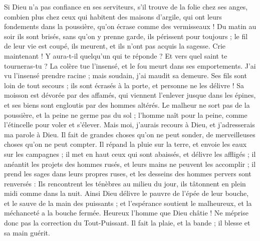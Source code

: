\begin{multicols}{2}
Si Dieu n'a pas confiance en ses serviteurs, s'il trouve de la folie chez ses anges,
combien plus chez ceux qui habitent des maisons d'argile, qui ont leurs fondements dans la poussière, qu'on écrase comme des vermisseaux !
Du matin au soir ils sont brisés, sans qu'on y prenne garde, ils périssent pour toujours ;
le fil de leur vie est coupé, ils meurent, et ils n'ont pas acquis la sagesse.
\VerseOne{}Crie maintenant ! Y aura-t-il quelqu'un qui te réponde ? Et vers quel saint te tourneras-tu ?
La colère tue l'insensé, et le fou meurt dans ses emportements.
J'ai vu l'insensé prendre racine ; mais soudain, j'ai maudit sa demeure.
Ses fils sont loin de tout secours ; ils sont écrasés à la porte, et personne ne les délivre !
Sa moisson est dévorée par des affamés, qui viennent l'enlever jusque dans les épines, et ses biens sont engloutis par des hommes altérés.
Le malheur ne sort pas de la poussière, et la peine ne germe pas du sol ;
l'homme naît pour la peine, comme l'étincelle pour voler et s'élever.
Mais moi, j'aurais recours à Dieu, et j'adresserais ma parole à Dieu.
Il fait de grandes choses qu'on ne peut sonder, de merveilleuses choses qu'on ne peut compter.
Il répand la pluie sur la terre, et envoie les eaux sur les campagnes ;
il met en haut ceux qui sont abaissés, et délivre les affligés ;
il anéantit les projets des hommes rusés, et leurs mains ne peuvent les accomplir ;
il prend les sages dans leurs propres ruses, et les desseins des hommes pervers sont renversés :
Ils rencontrent les ténèbres au milieu du jour, ils tâtonnent en plein midi comme dans la nuit.
Ainsi Dieu délivre le pauvre de l'épée de leur bouche, et le sauve de la main des puissants ;
et l'espérance soutient le malheureux, et la méchanceté a la bouche fermée.
Heureux l'homme que Dieu châtie ! Ne méprise donc pas la correction du Tout-Puissant.
Il fait la plaie, et la bande ; il blesse et sa main guérit.

\end{multicols}
